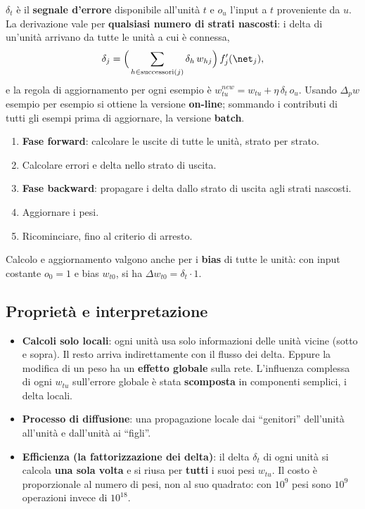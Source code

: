 $\delta_t$ è il \textbf{segnale d'errore} disponibile all'unità $t$ e $o_u$ l'input a $t$ proveniente da $u$.
La derivazione vale per \textbf{qualsiasi numero di strati nascosti}: i delta di un'unità arrivano da tutte le
unità a cui è connessa,
\begin{equation}\label{eq:delta-generale}
\delta_j = \Big(\sum_{h\in\mathrm{successori}(j)}\delta_h\,w_{hj}\Big)\,f'_j(\net_j),
\end{equation}
e la regola di aggiornamento per ogni esempio è $w_{tu}^{\mathit{new}} = w_{tu} + \eta\,\delta_t\,o_u$. Usando
$\Delta_pw$ esempio per esempio si ottiene la versione \textbf{on-line}; sommando i contributi di tutti gli esempi
prima di aggiornare, la versione \textbf{batch}.

\begin{algoritmo}
\begin{enumerate}
  \item \textbf{Fase forward}: calcolare le uscite di tutte le unità, strato per strato.
  \item Calcolare errori e delta nello strato di uscita.
  \item \textbf{Fase backward}: propagare i delta dallo strato di uscita agli strati nascosti.
  \item Aggiornare i pesi.
  \item Ricominciare, fino al criterio di arresto.
\end{enumerate}
\end{algoritmo}

\begin{attenzione}
Calcolo e aggiornamento valgono anche per i \textbf{bias} di tutte le unità: con input costante $o_0=1$ e bias
$w_{t0}$, si ha $\Delta w_{t0} = \delta_t\cdot1$.
\end{attenzione}

\subsection{Proprietà e interpretazione}
\label{sec:proprieta-bp}

\begin{itemize}
  \item \textbf{Calcoli solo locali}: ogni unità usa solo informazioni delle unità vicine (sotto e sopra). Il resto
        arriva indirettamente con il flusso dei delta. Eppure la modifica di un peso ha un \textbf{effetto
        globale} sulla rete. L'influenza complessa di ogni $w_{tu}$ sull'errore globale è stata
        \textbf{scomposta} in componenti semplici, i delta locali.
  \item \textbf{Processo di diffusione}: una propagazione locale dai ``genitori'' dell'unità all'unità e
        dall'unità ai ``figli''.
  \item \textbf{Efficienza (la fattorizzazione dei delta)}: il delta $\delta_t$ di ogni unità si calcola \textbf{una
        sola volta} e si riusa per \textbf{tutti} i suoi pesi $w_{tu}$. Il costo è proporzionale al numero di pesi,
        non al suo quadrato: con $10^9$ pesi sono $10^9$ operazioni invece di $10^{18}$.
\end{itemize}

